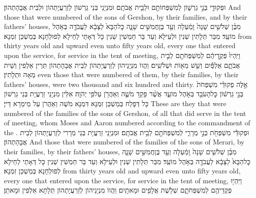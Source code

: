 {וּפְקוּדֵ֖י בְּנֵ֣י גֵרְשׁ֑וֹן לְמִשְׁפְּחוֹתָ֖ם וּלְבֵ֥ית אֲבֹתָֽם׃}
{וּמִנְיָנֵי בְּנֵי גֵרְשׁוֹן לְזַרְעֲיָתְהוֹן וּלְבֵית אֲבָהָתְהוֹן׃}
{And those that were numbered of the sons of Gershon, by their families, and by their fathers’ houses,}{}
{מִבֶּ֨ן שְׁלֹשִׁ֤ים שָׁנָה֙ וָמַ֔עְלָה וְעַ֖ד בֶּן\maqqaf חֲמִשִּׁ֣ים שָׁנָ֑ה כׇּל\maqqaf הַבָּא֙ לַצָּבָ֔א לַעֲבֹדָ֖ה בְּאֹ֥הֶל מוֹעֵֽד׃}
{מִבַּר תְּלָתִין שְׁנִין וּלְעֵילָא וְעַד בַּר חַמְשִׁין שְׁנִין כָּל דְּאָתֵי לְחֵילָא לְפוּלְחָנָא בְּמַשְׁכַּן זִמְנָא׃}
{from thirty years old and upward even unto fifty years old, every one that entered upon the service, for service in the tent of meeting,}{}
{וַיִּֽהְיוּ֙ פְּקֻ֣דֵיהֶ֔ם לְמִשְׁפְּחֹתָ֖ם לְבֵ֣ית אֲבֹתָ֑ם אַלְפַּ֕יִם וְשֵׁ֥שׁ מֵא֖וֹת וּשְׁלֹשִֽׁים׃}
{וַהֲווֹ מִנְיָנֵיהוֹן לְזַרְעֲיָתְהוֹן לְבֵית אֲבָהָתְהוֹן תְּרֵין אַלְפִין וְשֵׁית מְאָה וּתְלָתִין׃}
{even those that were numbered of them, by their families, by their fathers’ houses, were two thousand and six hundred and thirty.}{}
{אֵ֣לֶּה פְקוּדֵ֗י מִשְׁפְּחֹת֙ בְּנֵ֣י גֵרְשׁ֔וֹן כׇּל\maqqaf הָעֹבֵ֖ד בְּאֹ֣הֶל מוֹעֵ֑ד אֲשֶׁ֨ר פָּקַ֥ד מֹשֶׁ֛ה וְאַהֲרֹ֖ן עַל\maqqaf פִּ֥י יְהֹוָֽה׃}
{אִלֵּין מִנְיָנֵי זַרְעֲיָת בְּנֵי גֵרְשׁוֹן כָּל דְּפָלַח בְּמַשְׁכַּן זִמְנָא דִּמְנָא מֹשֶׁה וְאַהֲרֹן עַל מֵימְרָא דַּייָ׃}
{These are they that were numbered of the families of the sons of Gershon, of all that did serve in the tent of meeting, whom Moses and Aaron numbered according to the commandment of the \lord.}{}
{וּפְקוּדֵ֕י מִשְׁפְּחֹ֖ת בְּנֵ֣י מְרָרִ֑י לְמִשְׁפְּחֹתָ֖ם לְבֵ֥ית אֲבֹתָֽם׃}
{וּמִנְיָנֵי זַרְעֲיָת בְּנֵי מְרָרִי לְזַרְעֲיָתְהוֹן לְבֵית אֲבָהָתְהוֹן׃}
{And those that were numbered of the families of the sons of Merari, by their families, by their fathers’ houses,}{}
{מִבֶּ֨ן שְׁלֹשִׁ֤ים שָׁנָה֙ וָמַ֔עְלָה וְעַ֖ד בֶּן\maqqaf חֲמִשִּׁ֣ים שָׁנָ֑ה כׇּל\maqqaf הַבָּא֙ לַצָּבָ֔א לַעֲבֹדָ֖ה בְּאֹ֥הֶל מוֹעֵֽד׃}
{מִבַּר תְּלָתִין שְׁנִין וּלְעֵילָא וְעַד בַּר חַמְשִׁין שְׁנִין כָּל דְּאָתֵי לְחֵילָא לְפוּלְחָנָא בְּמַשְׁכַּן זִמְנָא׃}
{from thirty years old and upward even unto fifty years old, every one that entered upon the service, for service in the tent of meeting,}{}
{וַיִּהְי֥וּ פְקֻדֵיהֶ֖ם לְמִשְׁפְּחֹתָ֑ם שְׁלֹ֥שֶׁת אֲלָפִ֖ים וּמָאתָֽיִם׃}
{וַהֲווֹ מִנְיָנֵיהוֹן לְזַרְעֲיָתְהוֹן תְּלָתָא אַלְפִין וּמָאתַן׃}
